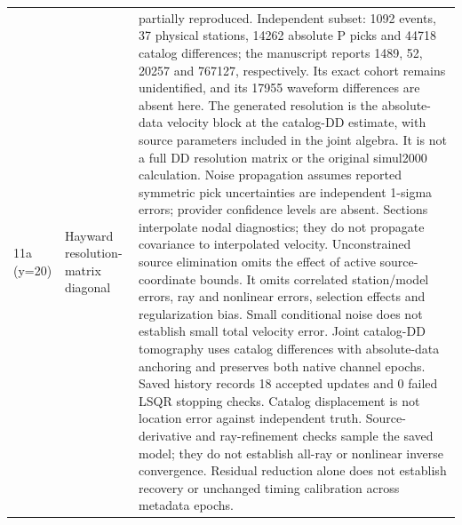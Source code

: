 \begin{longtable}{>{\raggedright\arraybackslash}p{}>{\raggedright\arraybackslash}p{}>{\raggedright\arraybackslash}p{}}
11a (y=20) & Hayward resolution-matrix diagonal & partially reproduced. Independent subset: 1092 events, 37 physical stations, 14262 absolute P picks and 44718 catalog differences; the manuscript reports 1489, 52, 20257 and 767127, respectively. Its exact cohort remains unidentified, and its 17955 waveform differences are absent here. The generated resolution is the absolute-data velocity block at the catalog-DD estimate, with source parameters included in the joint algebra. It is not a full DD resolution matrix or the original simul2000 calculation. Noise propagation assumes reported symmetric pick uncertainties are independent 1-sigma errors; provider confidence levels are absent. Sections interpolate nodal diagnostics; they do not propagate covariance to interpolated velocity. Unconstrained source elimination omits the effect of active source-coordinate bounds. It omits correlated station/model errors, ray and nonlinear errors, selection effects and regularization bias. Small conditional noise does not establish small total velocity error. Joint catalog-DD tomography uses catalog differences with absolute-data anchoring and preserves both native channel epochs. Saved history records 18 accepted updates and 0 failed LSQR stopping checks. Catalog displacement is not location error against independent truth. Source-derivative and ray-refinement checks sample the saved model; they do not establish all-ray or nonlinear inverse convergence. Residual reduction alone does not establish recovery or unchanged timing calibration across metadata epochs.\\

\end{longtable}
